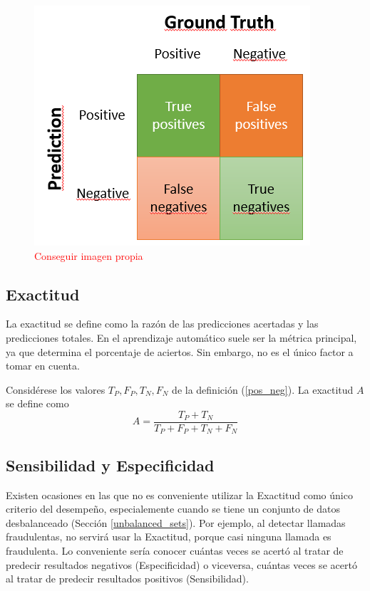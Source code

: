 \begin{figure}[H]
    \centering
    \includegraphics{../cap5_experimentos/src/matriz_confusion_binaria.png}
    \caption{\textcolor{red}{Conseguir imagen propia}}
\end{figure}
\subsection{Exactitud}
La exactitud se define como la razón de las predicciones acertadas y las predicciones totales. En el aprendizaje automático suele ser la métrica principal, ya que determina el porcentaje de aciertos. Sin embargo, no es el único factor  a tomar en cuenta.
\begin{definition}[exactitud]
    Considérese los valores $T_P, F_P, T_N, F_N$ de la definición (\ref{pos_neg}). La exactitud $A$ se define como 
    \begin{equation}
        A = \frac{T_P + T_N}{T_P + F_P + T_N + F_N}
    \end{equation}
\end{definition}
\subsection{Sensibilidad y Especificidad}
Existen ocasiones en las que no es conveniente utilizar la Exactitud como único criterio del desempeño, especialemente cuando se tiene un conjunto de datos desbalanceado (Sección \ref{unbalanced_sets}). Por ejemplo, al detectar llamadas fraudulentas, no servirá usar la Exactitud, porque casi ninguna llamada es fraudulenta. Lo conveniente sería conocer cuántas veces se acertó al tratar de predecir resultados negativos (Especificidad) o viceversa, cuántas veces se acertó al tratar de predecir resultados positivos (Sensibilidad). 

